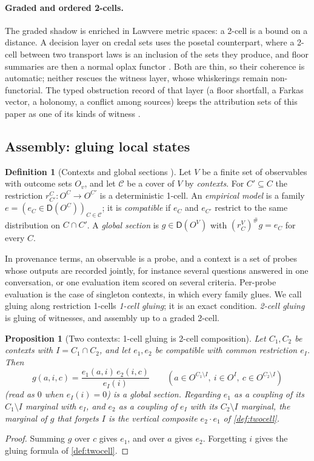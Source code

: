 \documentclass[11pt]{article}
\newtheorem{proposition}[theorem]{Proposition}
\theoremstyle{definition}
\newtheorem{definition}[theorem]{Definition}
\theoremstyle{remark}
\newcommand{\D}{\mathsf{D}}
\begin{document}
\paragraph{Graded and ordered 2-cells.} The graded shadow is enriched in Lawvere metric spaces: a 2-cell is a bound on a distance. A decision layer on credal sets uses the
posetal counterpart, where a 2-cell between two transport laws is an inclusion of the sets they produce, and floor summaries are
then a normal oplax functor \cite[Prop.~10.24]{Awasthi-Tower}. Both are thin, so their coherence is automatic; neither rescues the
witness layer, whose whiskerings remain non-functorial. The typed obstruction record of that layer (a floor shortfall, a Farkas
vector, a holonomy, a conflict among sources) keeps the attribution sets of this paper as one of its kinds of witness
\cite[Section~14]{Validation}.


\subsection{Assembly: gluing local states}\label{sec:assembly}

\begin{definition}[Contexts and global sections \cite{AbramskyBrandenburger2011}]\label{def:contexts}
Let $V$ be a finite set of observables with outcome sets $O_v$, and let $\mathcal C$ be a cover of $V$
by \emph{contexts}. For $C'\subseteq C$ the restriction $r^C_{C'}\colon O^C\to O^{C'}$ is a
deterministic 1-cell. An \emph{empirical model} is a family $e=(e_C\in\D(O^C))_{C\in\mathcal C}$; it is
\emph{compatible} if $e_C$ and $e_{C'}$ restrict to the same distribution on $C\cap C'$. A
\emph{global section} is $g\in\D(O^V)$ with $(r^V_C)^\#g=e_C$ for every $C$.
\end{definition}

In provenance terms, an observable is a probe, and a context is a set of probes whose outputs are
recorded jointly, for instance several questions answered in one conversation, or one evaluation
item scored on several criteria. Per-probe evaluation is the case of singleton contexts, in which
every family glues. We call gluing along restriction 1-cells \emph{1-cell gluing}; it is an exact
condition. \emph{2-cell gluing} is gluing of witnesses, and assembly up to a graded 2-cell.

\begin{proposition}[Two contexts: 1-cell gluing is 2-cell composition]\label{prop:twoctx}
Let $C_1,C_2$ be contexts with $I=C_1\cap C_2$, and let $e_1,e_2$ be compatible with common
restriction $e_I$. Then
\[
g(a,i,c)=\frac{e_1(a,i)\,e_2(i,c)}{e_I(i)}\qquad(a\in O^{C_1\setminus I},\ i\in O^I,\ c\in O^{C_2\setminus I})
\]
(read as $0$ when $e_I(i)=0$) is a global section. Regarding $e_1$ as a coupling of its $C_1\setminus I$ marginal with $e_I$, and
$e_2$ as a coupling of $e_I$ with its $C_2\setminus I$ marginal, the marginal of $g$ that forgets $I$
is the vertical composite $e_2\cdot e_1$ of \cref{def:twocell}.
\end{proposition}
\begin{proof}
Summing $g$ over $c$ gives $e_1$, and over $a$ gives $e_2$. Forgetting $i$ gives the gluing formula of
\cref{def:twocell}.
\end{proof}
\end{document}
